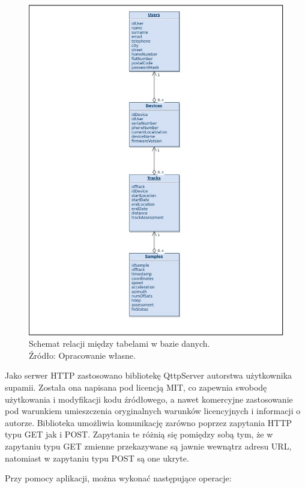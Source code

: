 \begin{figure}[H]
	\centering
	\includegraphics[width=17cm]{img/software/database/Database_relations.jpg}
	\caption{Schemat relacji między tabelami w bazie danych. 
	\\Źródło: Opracowanie własne.}
	\label{fig:image_soft_db_relations}
\end{figure}

Jako serwer HTTP zastosowano bibliotekę QttpServer autorstwa użytkownika supamii\cite{qttpserver}. Została ona napisana pod licencją MIT, co zapewnia swobodę użytkowania i modyfikacji kodu źródłowego, a nawet komercyjne zastosowanie pod warunkiem umieszczenia oryginalnych warunków licencyjnych i informacji o autorze. Biblioteka umożliwia komunikację zarówno poprzez zapytania HTTP typu GET jak i POST. Zapytania te różnią się pomiędzy sobą tym, że w zapytaniu typu GET zmienne przekazywane są jawnie wewnątrz adresu URL, natomiast w zapytaniu typu POST są one ukryte.

Przy pomocy aplikacji, można wykonać następujące operacje:

